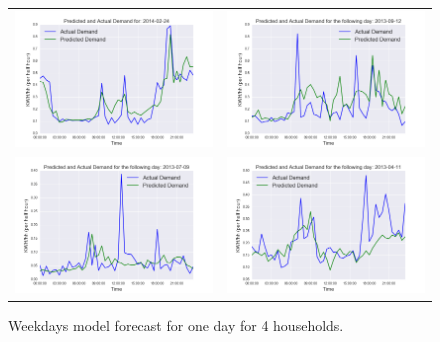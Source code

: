 \documentclass{beamer}
\begin{document}
\begin{frame}

\begin{figure}[htb]
\centering
 \begin{tabular}{@{}cc@{}}
   \includegraphics[width=.5\textwidth]{../img/fig2a.png} &
   \includegraphics[width=.5\textwidth]{../img/fig2b.png}   \\
   \includegraphics[width=.5\textwidth]{../img/fig2c.png} &
   \includegraphics[width=.5\textwidth]{../img/fig2d.png}
  \end{tabular}
  \caption{Weekdays model forecast for one day for 4 households.}
\end{figure}


\end{frame}
\end{document}
